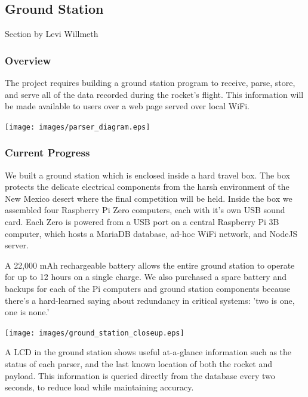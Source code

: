\documentclass[onecolumn, draftclsnofoot, 10pt, compsoc]{IEEEtran}
\begin{document}

\subsection{Ground Station}
Section by Levi Willmeth
\subsubsection{Overview}
The project requires building a ground station program to receive, parse, store, and serve all of the data recorded during the rocket's flight.  This information will be made available to users over a web page served over local WiFi.

\begin{center}
	\texttt{[image: images/parser\_diagram.eps]}
    \label{gs-diagram}
\end{center}

\subsubsection{Current Progress}
We built a ground station which is enclosed inside a hard travel box.  The box protects the delicate electrical components from the harsh environment of the New Mexico desert where the final competition will be held.  Inside the box we assembled four Raspberry Pi Zero computers, each with it's own USB sound card.  Each Zero is powered from a USB port on a central Raspberry Pi 3B computer, which hosts a MariaDB database, ad-hoc WiFi network, and NodeJS server.

A 22,000 mAh rechargeable battery allows the entire ground station to operate for up to 12 hours on a single charge. We also purchased a spare battery and backups for each of the Pi computers and ground station components because there's a hard-learned saying about redundancy in critical systems:  'two is one, one is none.'

\begin{center}
	\texttt{[image: images/ground\_station\_closeup.eps]}
    \label{gs_closeup}
\end{center}

A LCD in the ground station shows useful at-a-glance information such as the status of each parser, and the last known location of both the rocket and payload.  This information is queried directly from the database every two seconds, to reduce load while maintaining accuracy.
\end{document}
